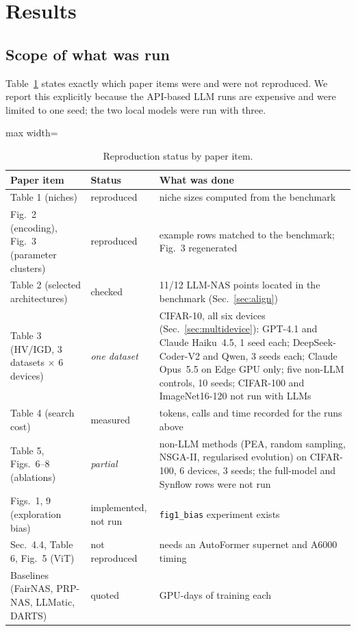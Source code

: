 \documentclass[preprint,12pt,authoryear]{elsarticle}
\newcommand{\code}[1]{\texttt{#1}}
\begin{document}
\section{Results}\label{sec:results}

\subsection{Scope of what was run}
Table~\ref{tab:scope} states exactly which paper items were and were not reproduced. We report this explicitly because the API-based LLM runs are expensive and were limited to one seed; the two local models were run with three.
\begin{table}[h]\centering\small
\caption{Reproduction status by paper item.}\label{tab:scope}
\begin{adjustbox}{max width=\linewidth}
\begin{tabular}{p{4.3cm}p{2.3cm}p{8.1cm}}
\toprule
Paper item & Status & What was done \\
\midrule
Table 1 (niches) & reproduced & niche sizes computed from the benchmark \\
Fig.~2 (encoding), Fig.~3 (parameter clusters) & reproduced & example rows matched to the benchmark; Fig.~3 regenerated \\
Table 2 (selected architectures) & checked & 11/12 LLM-NAS points located in the benchmark (Sec.~\ref{sec:align}) \\
Table 3 (HV/IGD, 3 datasets $\times$ 6 devices) & \emph{one dataset} & CIFAR-10, all six devices (Sec.~\ref{sec:multidevice}): GPT-4.1 and Claude Haiku~4.5, 1 seed each; DeepSeek-Coder-V2 and Qwen, 3 seeds each; Claude Opus~5.5 on Edge GPU only; five non-LLM controls, 10 seeds; CIFAR-100 and ImageNet16-120 not run with LLMs \\
Table 4 (search cost) & measured & tokens, calls and time recorded for the runs above \\
Table 5, Figs.~6--8 (ablations) & \emph{partial} & non-LLM methods (PEA, random sampling, NSGA-II, regularised evolution) on CIFAR-100, 6 devices, 3 seeds; the full-model and Synflow rows were not run \\
Figs.~1, 9 (exploration bias) & implemented, not run & \code{fig1\_bias} experiment exists \\
Sec.~4.4, Table 6, Fig.~5 (ViT) & not reproduced & needs an AutoFormer supernet and A6000 timing \\
Baselines (FairNAS, PRP-NAS, LLMatic, DARTS) & quoted & GPU-days of training each \\
\bottomrule
\end{tabular}
\end{adjustbox}
\end{table}
\end{document}

